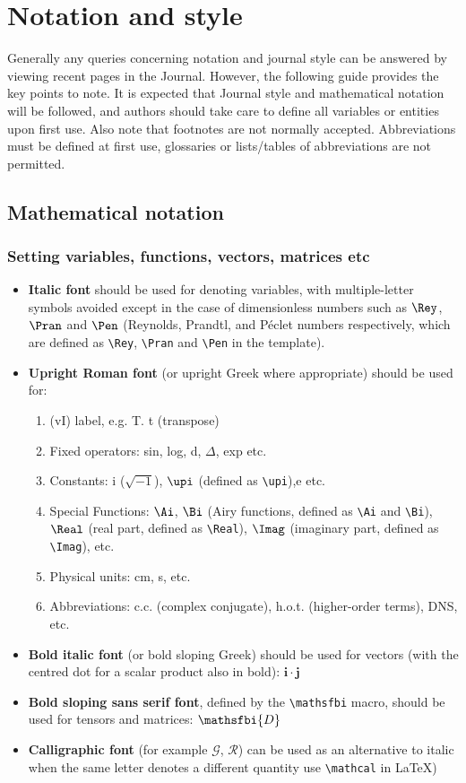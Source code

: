 \documentclass[lineno]{JFM-FLM_Au}
\begin{document}
\section{Notation and style}\label{notstyle}
 Generally any queries concerning notation and journal style can be answered by viewing recent pages in the Journal. However, the following guide provides the key points to note. It is expected that Journal style and mathematical notation will be followed, and authors should take care to define all variables or entities upon first use. Also note that footnotes are not normally accepted.  Abbreviations must be defined at first use, glossaries or lists/tables of abbreviations are not permitted.

\subsection{Mathematical notation}
\subsubsection{Setting variables, functions, vectors, matrices etc}
\begin{itemize} \label{sec:MathNot}
\item {\bf Italic font} should be used for denoting variables, with multiple-letter symbols avoided except in the case of dimensionless numbers such as $\Rey$, $\Pran$ and $\Pen$ (Reynolds, Prandtl, and P\'eclet numbers respectively, which are defined as \verb}\Rey}, \verb}\Pran} and \verb}\Pen} in the template).
\item {\bf Upright Roman font} (or upright Greek where appropriate) should be used for:
\begin{enumerate}%
\item (vI) label, e.g.  T. t (transpose)
\item Fixed operators: sin, log, d, $\Delta$, exp etc.
\item Constants: i ($\sqrt{-1}$), $\upi$ (defined as \verb}\upi}),e  etc.
\item Special Functions: $\Ai$, $\Bi$ (Airy functions, defined as \verb}\Ai} and \verb}\Bi}), $\Real$ (real part, defined as \verb}\Real}), $\Imag$ (imaginary part, defined as \verb}\Imag}), etc.
\item Physical units: cm, s, etc.
\item Abbreviations: c.c. (complex conjugate), h.o.t. (higher-order terms), DNS, etc.
\end{enumerate}
\item {\bf Bold italic font} (or bold sloping Greek) should be used for vectors (with the centred dot for a scalar product also in bold): $\boldsymbol{i \cdot j}$
\item {\bf Bold sloping sans serif font}, defined by the \verb}\mathsfbi} macro, should be used for tensors and matrices: $\mathsfbi{D}$
\item {\bf Calligraphic font} (for example $\mathcal{G}$, $\mathcal{R}$) can be used as an alternative to italic when the same letter denotes a different quantity use \verb}\mathcal} in \LaTeX)
\end{itemize}
\end{document}
